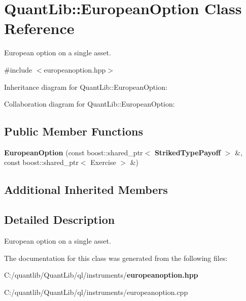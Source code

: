 \section{Quant\+Lib\+:\+:European\+Option Class Reference}
\label{class_quant_lib_1_1_european_option}


European option on a single asset.  




{\ttfamily \#include $<$europeanoption.\+hpp$>$}



Inheritance diagram for Quant\+Lib\+:\+:European\+Option\+:


Collaboration diagram for Quant\+Lib\+:\+:European\+Option\+:
\subsection*{Public Member Functions}
\begin{DoxyCompactItemize}
\item 
{\bfseries European\+Option} (const boost\+::shared\+\_\+ptr$<$ {\bf Striked\+Type\+Payoff} $>$ \&, const boost\+::shared\+\_\+ptr$<$ Exercise $>$ \&)\label{class_quant_lib_1_1_european_option_ab09e58ce915ef1ab60b623be23efd69c}

\end{DoxyCompactItemize}
\subsection*{Additional Inherited Members}


\subsection{Detailed Description}
European option on a single asset. 



The documentation for this class was generated from the following files\+:\begin{DoxyCompactItemize}
\item 
C\+:/quantlib/\+Quant\+Lib/ql/instruments/{\bf europeanoption.\+hpp}\item 
C\+:/quantlib/\+Quant\+Lib/ql/instruments/europeanoption.\+cpp\end{DoxyCompactItemize}
